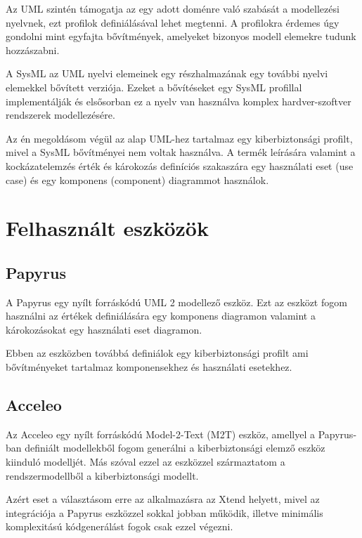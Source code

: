Az UML szintén támogatja az egy adott doménre való szabását a modellezési nyelvnek, ezt profilok definiálásával lehet megtenni. A profilokra érdemes úgy gondolni mint egyfajta bővítmények, amelyeket bizonyos modell elemekre tudunk hozzászabni.


A SysML az UML nyelvi elemeinek egy részhalmazának egy további nyelvi elemekkel bővített verziója. Ezeket a bővítéseket egy SysML profillal implementálják és elsősorban ez a nyelv van használva komplex hardver-szoftver rendszerek modellezésére.


Az én megoldásom végül az alap UML-hez tartalmaz egy kiberbiztonsági profilt, mivel a SysML bővítményei nem voltak használva. A termék leírására valamint a kockázatelemzés érték és károkozás definíciós szakaszára egy használati eset (use case) és egy komponens (component) diagrammot használok.



\section{Felhasznált eszközök}

\subsection{Papyrus}

A Papyrus egy nyílt forráskódú UML 2 modellező eszköz. Ezt az eszközt fogom használni az értékek definiálására egy komponens diagramon valamint a károkozásokat egy használati eset diagramon.

Ebben az eszközben továbbá definiálok egy kiberbiztonsági profilt ami bővítményeket tartalmaz komponensekhez és használati esetekhez.



\subsection{Acceleo}

Az Acceleo egy nyílt forráskódú Model-2-Text (M2T) eszköz, amellyel a Papyrus-ban definiált modellekből fogom generálni a kiberbiztonsági elemző eszköz kiinduló modelljét. Más szóval ezzel az eszközzel származtatom a rendszermodellből a kiberbiztonsági modellt.

Azért eset a választásom erre az alkalmazásra az Xtend helyett, mivel az integrációja a Papyrus eszközzel sokkal jobban működik, illetve minimális komplexitású kódgenerálást fogok csak ezzel végezni.



